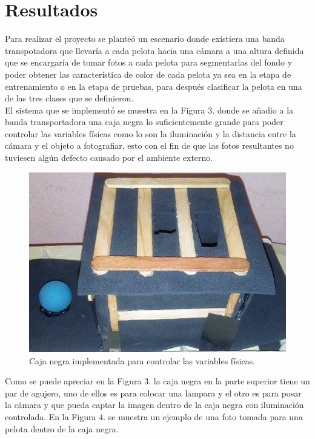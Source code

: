 \documentclass[conference]{IEEEtran}
\begin{document}
\newpage
\section{Resultados}
Para realizar el proyecto se plante\'o un escenario donde existiera una banda transpotadora que llevar\'ia a cada pelota hacia una c\'amara a una altura definida que se encargar\'ia de tomar fotos a cada pelota para segmentarlas del fondo y poder obtener las caracter\'istica de color de cada pelota ya sea en la etapa de entrenamiento o en la etapa de pruebas, para despu\'es clasificar la pelota en una de las tres clases que se definieron.\\

El sistema que se implement\'o se muestra en la Figura 3. donde se a\~nadio a la banda transportadora una caja negra lo suficientemente grande para poder controlar las variables f\'isicas como lo son la iluminaci\'on y la distancia entre la c\'amara y el objeto a fotografiar, esto con el fin de que las fotos resultantes no tuviesen alg\'un defecto causado por el ambiente externo.

\begin{figure}[h]
	\setlength{\unitlength}{0.0105in}
	\centering
	\includegraphics[scale=0.30]{./images/bird_house.jpg}
	\caption{ Caja negra implementada para controlar las variables f\'isicas.}
\end{figure}

Como se puede apreciar en la Figura 3. la caja negra en la parte superior tiene un par de agujero, uno de ellos es para colocar una lampara y el otro es para posar la c\'amara y que pueda captar la imagen dentro de la caja negra con iluminaci\'on controlada. En la Figura 4. se muestra un ejemplo de una foto tomada para una pelota dentro de la caja negra.
\end{document}
